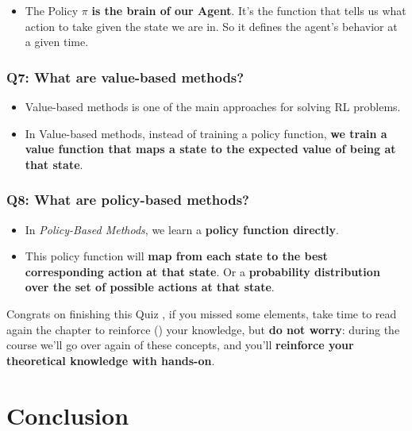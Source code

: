 \documentclass[11pt,a4paper]{article}
\begin{document}
\begin{itemize}
\tightlist
\item
  The Policy $\pi$ \textbf{is the brain of our Agent}. It's the function that tells us what action to take given the state we are in. So it defines the agent's behavior at a given time.
\end{itemize}


\subsubsection{Q7: What are value-based methods?}\label{q7-what-are-value-based-methods-1}

\begin{itemize}
\tightlist
\item
  Value-based methods is one of the main approaches for solving RL problems.
\item
  In Value-based methods, instead of training a policy function, \textbf{we train a value function that maps a state to the expected value of being at that state}.
\end{itemize}

\subsubsection{Q8: What are policy-based methods?}\label{q8-what-are-policy-based-methods-1}

\begin{itemize}
\tightlist
\item
  In \emph{Policy-Based Methods}, we learn a \textbf{policy function directly}.
\item
  This policy function will \textbf{map from each state to the best corresponding action at that state}. Or a \textbf{probability distribution over the set of possible actions at that state}.
\end{itemize}

Congrats on finishing this Quiz , if you missed some elements, take time to read again the chapter to reinforce () your knowledge, but \textbf{do not worry}: during the course we'll go over again of these concepts, and you'll \textbf{reinforce your theoretical knowledge with hands-on}.

\section{Conclusion}\label{conclusion}
\end{document}
